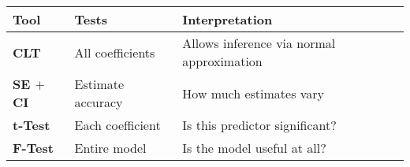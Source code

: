 \highspace
\begin{table}[!htp]
    \centering
    \begin{tabular}{@{} l l l @{}}
        \toprule
        \textbf{Tool} & \textbf{Tests} & \textbf{Interpretation} \\
        \midrule
        \textbf{CLT}        & All coefficients & Allows inference via normal approximation \\ [.3em]
        \textbf{SE $+$ CI}  & Estimate accuracy & How much estimates vary \\ [.3em]
        \textbf{t-Test}     & Each coefficient & Is this predictor significant? \\ [.3em]
        \textbf{F-Test}     & Entire model & Is the model useful at all? \\
        \bottomrule
    \end{tabular}
\end{table}
